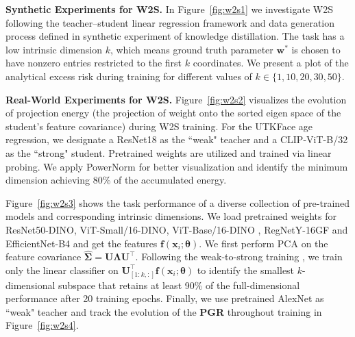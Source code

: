\documentclass{article}
\theoremstyle{definition}
\theoremstyle{definition}
\theoremstyle{plain}
\theoremstyle{plain}
\theoremstyle{plain}
\theoremstyle{plain}
\theoremstyle{plain}
\begin{document}
\textbf{Synthetic Experiments for W2S.} 
In Figure~\ref{fig:w2s1} we investigate W2S following the teacher–student linear regression framework and data generation process defined in synthetic experiment of knowledge distillation. The task has a low intrinsic dimension $k$, which means ground truth parameter $\mathbf{w}^*$ is chosen to have nonzero entries restricted to the first 
$k$ coordinates. We present a plot of the analytical excess risk during training for different values of $k \in \{1, 10, 20, 30, 50\}.$


\textbf{Real-World Experiments for W2S.} Figure~\ref{fig:w2s2} visualizes the evolution of projection energy (the projection of weight onto the sorted eigen space of the student’s feature covariance) during W2S training. For the UTKFace age regression, we designate a ResNet18 as the ``weak" teacher and a CLIP-ViT-B/32 \citep{radford2021learning} as the ``strong" student. Pretrained weights \citep{wolf-etal-2020-transformers, torchvision2016} are utilized and trained via linear probing. We apply PowerNorm \citep{gonzalez2008digital} for better visualization and identify the minimum dimension achieving 80\% of the accumulated energy. 

Figure~\ref{fig:w2s3} shows the task performance of a diverse collection of pre-trained models and corresponding intrinsic dimensions. We load pretrained weights \citep{caron2021emerging, torchvision2016} for ResNet50-DINO, ViT-Small/16-DINO, ViT-Base/16-DINO \citep{caron2021emerging}, RegNetY-16GF \citep{radosavovic2020designing} and EfficientNet-B4 \citep{tan2019efficientnet} and get the features $\mathbf{f}(\mathbf{x}_i; \boldsymbol{\theta})$. We first perform PCA on the feature covariance $\hat{\mathbf{\Sigma}} = \mathbf{U \Lambda U}^\top$. 
Following the weak-to-strong training \citep{Burns2023WeaktoStrongGE}, we train only the linear classifier on $ \mathbf{U}_{[1:k, :]}^\top \mathbf{f}(\mathbf{x}_i; \boldsymbol{\theta})$ to identify the smallest $k$-dimensional subspace that retains at least 90\% of the full-dimensional performance after 20 training epochs. Finally, we use pretrained AlexNet \citep{krizhevsky2012imagenet, torchvision2016} as ``weak" teacher and track the evolution of the \textbf{PGR} throughout training in Figure~\ref{fig:w2s4}. 


\end{document}
